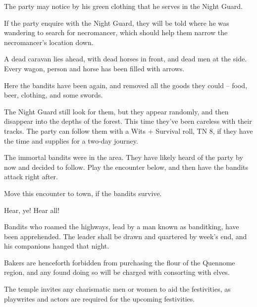 \begin{multicols}{2}
The party may notice by his green clothing that he serves in the Night Guard.

\ghoul

If the party enquire with the Night Guard, they will be told where he was wandering to search for \gls{necromancer}, which should help them narrow the necromancer's location down.


\begin{boxtext}

	A dead caravan lies ahead, with dead horses in front, and dead men at the side.  Every wagon, person and horse has been filled with arrows.

\end{boxtext}

Here the bandits have been again, and removed all the goods they could -- food, beer, clothing, and some swords.

The Night Guard still look for them, but they appear randomly, and then disappear into the depths of the forest.  This time they've been careless with their tracks.  The party can follow them with a Wits + Survival roll, TN 8, if they have the time and supplies for a two-day journey.


The immortal bandits were in the area.  They have likely heard of the party by now and decided to follow.  Play the encounter below, and then have the bandits attack right after.

\humansoldier

Move this encounter to town, if the bandits survive.


\begin{boxtext}
	Hear, ye!  Hear all!

	Bandits who roamed the highways, lead by a man known as \gls{banditking}, have been apprehended.  The leader shall be drawn and quartered by week's end, and his companions hanged that night.

	Bakers are henceforth forbidden from purchasing the flour of the Quennome region, and any found doing so will be charged with consorting with elves.

	The temple invites any charismatic men or women to aid the festivities, as playwrites and actors are required for the upcoming festivities.

\end{boxtext}


\end{multicols}

